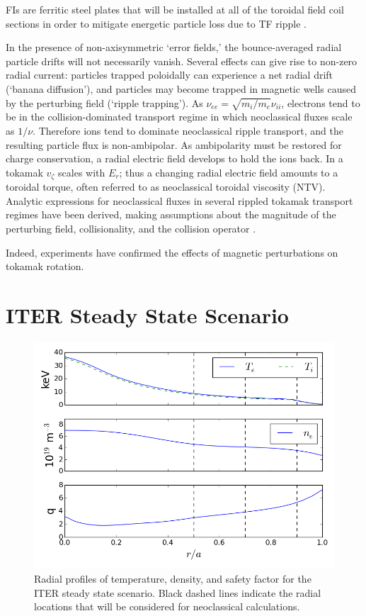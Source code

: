 \documentclass{article}
\begin{document}
FIs are ferritic steel plates that will be installed at all of the toroidal field coil sections in order to mitigate energetic particle loss due to TF ripple \cite{Tobita2003}. 

In the presence of non-axisymmetric `error fields,' the bounce-averaged radial particle drifts will not necessarily vanish. Several effects can give rise to non-zero radial current: particles trapped poloidally can experience a net radial drift (`banana diffusion'), and particles may become trapped in magnetic wells caused by the perturbing field (`ripple trapping'). As $\nu_{ee} = \sqrt{m_i/m_e} \nu_{ii}$, electrons tend to be in the collision-dominated transport regime in which neoclassical fluxes scale as $1/\nu$.  Therefore ions tend to dominate neoclassical ripple transport, and the resulting particle flux is non-ambipolar. As ambipolarity must be restored for charge conservation, a radial electric field develops to hold the ions back. In a tokamak $v_{\zeta}$ scales with $E_r$; thus a changing radial electric field amounts to a toroidal torque, often referred to as neoclassical toroidal viscosity (NTV). Analytic expressions for neoclassical fluxes in several rippled tokamak transport regimes have been derived, making assumptions about the magnitude of the perturbing field, collisionality, and the collision operator \cite{Shaing2003, Shaing2008, Shaing2010}. 

Indeed, experiments have confirmed the effects of magnetic perturbations on tokamak rotation. 

\section{ITER Steady State Scenario}

\FloatBarrier

\begin{figure}[h!]
\centering
\includegraphics[width=1\textwidth]{profiles.png}
\caption{\label{fig:profiles} Radial profiles of temperature, density, and safety factor for the ITER steady state scenario. Black dashed lines indicate the radial locations that will be considered for neoclassical calculations.}
\end{figure}
\end{document}
